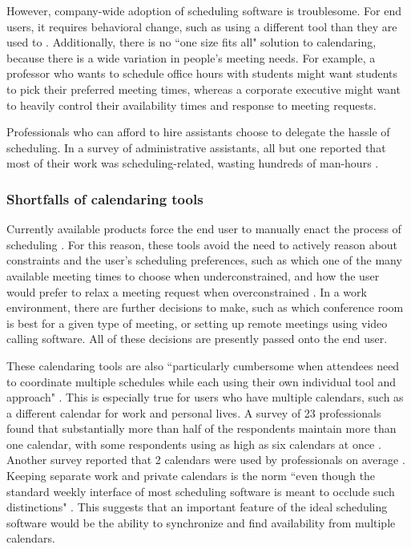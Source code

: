 \documentclass{article}
\begin{document}
However, company-wide adoption of scheduling software is troublesome. For end users, it requires behavioral change, such as using a different tool than they are used to \cite{ehrlich_strategies_1987}. Additionally, there is no ``one size fits all" solution to calendaring, because there is a wide variation in people's meeting needs. For example, a professor who wants to schedule office hours with students might want students to pick their preferred meeting times, whereas a corporate executive might want to heavily control their availability times and response to meeting requests.

Professionals who can afford to hire assistants choose to delegate the hassle of scheduling. In a survey of administrative assistants, all but one reported that most of their work was scheduling-related, wasting hundreds of man-hours \cite{erickson_assistance_2008}.

\subsubsection{Shortfalls of calendaring tools}

Currently available products force the end user to manually enact the process of scheduling \cite{jennings_agent-based_1995}. For this reason, these tools avoid the need to actively reason about constraints and the user's scheduling preferences, such as which one of the many available meeting times to choose when underconstrained, and how the user would prefer to relax a meeting request when overconstrained \cite{berry_ptime_2011}. In a work environment, there are further decisions to make, such as which conference room is best for a given type of meeting, or setting up remote meetings using video calling software. All of these decisions are presently passed onto the end user.

These calendaring tools are also ``particularly cumbersome when attendees need to coordinate multiple schedules while each using their own individual tool and approach" \cite{cranshaw_calendarhelp_2017}. This is especially true for users who have multiple calendars, such as a different calendar for work and personal lives. A survey of 23 professionals found that substantially more than half of the respondents maintain more than one calendar, with some respondents using as high as six calendars at once \cite{kelley_how_1982}. Another survey reported that 2 calendars were used by professionals on average \cite{kincaid_electronic_1985}. Keeping separate work and private calendars is the norm ``even though the standard weekly interface of most scheduling software is meant to occlude such distinctions" \cite{wajcman_digital_2019}. This suggests that an important feature of the ideal scheduling software would be the ability to synchronize and find availability from multiple calendars.
\end{document}
